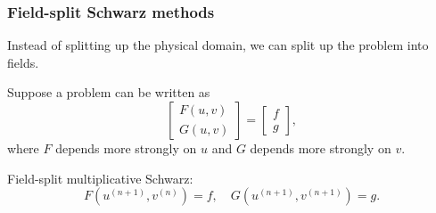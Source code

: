 \documentclass[10pt]{beamer}
\begin{document}
\begin{frame}
\frametitle{Field-split Schwarz methods}

Instead of splitting up the physical domain, we can split up the problem into fields.

Suppose a problem can be written as
\begin{equation*}
	\begin{bmatrix} F(u,v) \\ G(u,v) \end{bmatrix} = \begin{bmatrix} f \\ g \end{bmatrix},
\end{equation*}
where $F$ depends more strongly on $u$ and $G$ depends more strongly on $v$.

Field-split multiplicative Schwarz:
\begin{equation*}
	F(u^{(n+1)},v^{(n)}) = f, \quad G(u^{(n+1)},v^{(n+1)}) = g.
\end{equation*}


\end{frame}
\end{document}
